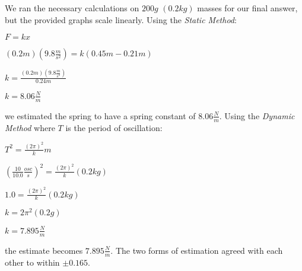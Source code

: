 \documentclass{article}
\begin{document}
We ran the necessary calculations on $200g$ $(0.2kg)$ masses for our final answer, but the provided graphs scale linearly. Using the \emph{Static Method}:
\begin{center}$F=kx$\end{center}
\begin{center}$(0.2m)(9.8\frac{m}{s^2})=k(0.45m-0.21m)$\end{center}
\begin{center}$k=\frac{(0.2m)(9.8\frac{m}{s^2})}{0.24m}$\end{center}
\begin{center}$k=8.06\frac{N}{m}$\end{center}
we estimated the spring to have a spring constant of $8.06\frac{N}{m}$.
Using the \emph{Dynamic Method} where $T$ is the period of oscillation:
\begin{center}$T^{2}=\frac{(2\pi)^{2}}{k}m$\end{center}
\begin{center}$(\frac{10}{10.0}\frac{osc}{s})^2=\frac{(2\pi)^{2}}{k}(0.2kg)$\end{center}
\begin{center}$1.0=\frac{(2\pi)^{2}}{k}(0.2kg)$\end{center}
\begin{center}$k=2\pi^2(0.2g)$\end{center}
\begin{center}$k=7.895\frac{N}{m}$\end{center}
the estimate becomes $7.895\frac{N}{m}$. The two forms of estimation agreed with each other to within $\pm{0.165}$.
\end{document}

